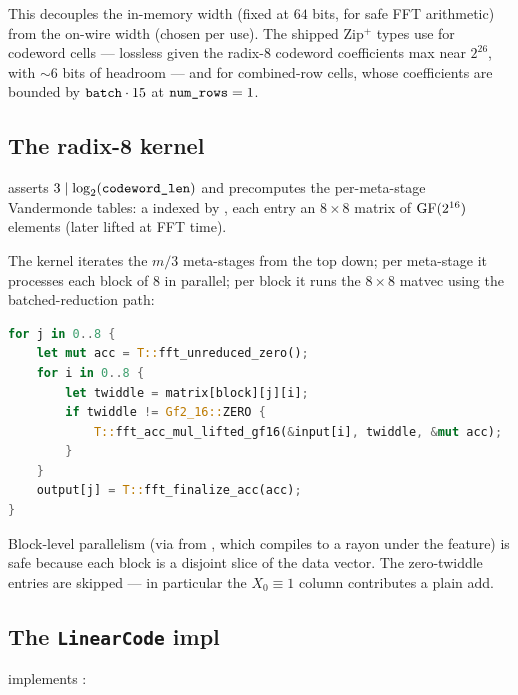 This decouples the in-memory width (fixed at $64$ bits, for safe FFT
arithmetic) from the on-wire width (chosen per use). The shipped Zip$^+$
types use  for codeword cells --- lossless given the
radix-8 codeword coefficients max near $2^{26}$, with $\sim 6$ bits of
headroom --- and  for combined-row cells, whose
coefficients are bounded by $\texttt{batch} \cdot 15$ at $\texttt{num\_rows}
= 1$.

\subsection{The radix-8 kernel}
\label{sec:kernel}

 asserts
$3 \mid \log_2(\texttt{codeword\_len})$ and precomputes the
per-meta-stage Vandermonde tables: a
 indexed by
, each entry an $8 \times 8$ matrix
of $\operatorname{GF}(2^{16})$ elements (later lifted at FFT time).

The kernel iterates the $m/3$ meta-stages from the top down; per
meta-stage it processes each block of $8$ in parallel; per block it
runs the $8 \times 8$ matvec using the batched-reduction path:

\begin{lstlisting}[language=Rust]
for j in 0..8 {
    let mut acc = T::fft_unreduced_zero();
    for i in 0..8 {
        let twiddle = matrix[block][j][i];
        if twiddle != Gf2_16::ZERO {
            T::fft_acc_mul_lifted_gf16(&input[i], twiddle, &mut acc);
        }
    }
    output[j] = T::fft_finalize_acc(acc);
}
\end{lstlisting}

\noindent Block-level parallelism (via  from
, which compiles to a rayon 
under the  feature) is safe because each block is a
disjoint slice of the data vector. The zero-twiddle entries are
skipped --- in particular the $X_0 \equiv 1$ column contributes a
plain add.

\subsection{The {\tt LinearCode} impl}
\label{sec:linear-code-impl}

 implements
:


